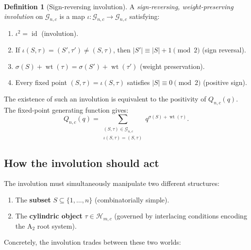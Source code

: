 \documentclass[11pt]{article}
\theoremstyle{plain}
\theoremstyle{definition}
\newtheorem{definition}[theorem]{Definition}
\begin{document}
\begin{definition}[Sign-reversing involution]
A \emph{sign-reversing, weight-preserving involution} on
$\mathcal{G}_{n,c}$ is a map
$\iota\colon \mathcal{G}_{n,c} \to \mathcal{G}_{n,c}$ satisfying:
\begin{enumerate}
  \item $\iota^2 = \operatorname{id}$ (involution).
  \item If $\iota(S, \tau) = (S', \tau') \neq (S, \tau)$, then
    $|S'| \equiv |S| + 1 \pmod{2}$ (sign reversal).
  \item $\sigma(S) + \operatorname{wt}(\tau)
    = \sigma(S') + \operatorname{wt}(\tau')$ (weight preservation).
  \item Every fixed point $(S, \tau) = \iota(S, \tau)$ satisfies
    $|S| \equiv 0 \pmod{2}$ (positive sign).
\end{enumerate}
\end{definition}

The existence of such an involution is equivalent to the positivity
of $Q_{n,c}(q)$.  The fixed-point generating function gives:
\[
  Q_{n,c}(q) = \sum_{\substack{(S,\tau) \in \mathcal{G}_{n,c} \\
  \iota(S,\tau) = (S,\tau)}} q^{\sigma(S) + \operatorname{wt}(\tau)}.
\]


\subsection{How the involution should act}

The involution must simultaneously manipulate two different
structures:
\begin{enumerate}
  \item The \textbf{subset} $S \subseteq \{1, \ldots, n\}$
    (combinatorially simple).
  \item The \textbf{cylindric object} $\tau \in \mathcal{H}_{m,c}$
    (governed by interlacing conditions encoding the $\mathrm{A}_2$
    root system).
\end{enumerate}

Concretely, the involution trades between these two worlds:
\end{document}
